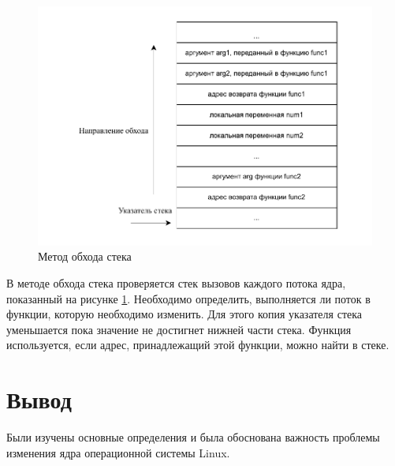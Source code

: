 \begin{figure}[H]
	\begin{center}
		\includegraphics[scale=0.9]{img/call-stack.pdf}
	\end{center}
	\captionsetup{justification=centering}
	\caption{Метод обхода стека}
	\label{img:call-stack}
\end{figure}

В методе обхода стека проверяется стек вызовов каждого потока ядра, показанный на рисунке \ref{img:call-stack}. Необходимо определить, выполняется ли поток в функции, которую необходимо изменить. Для этого копия указателя стека уменьшается пока значение не достигнет нижней части стека. Функция используется, если адрес, принадлежащий этой функции, можно найти в стеке.


\section{Вывод}

Были изучены основные определения и была обоснована важность проблемы изменения ядра операционной системы Linux.